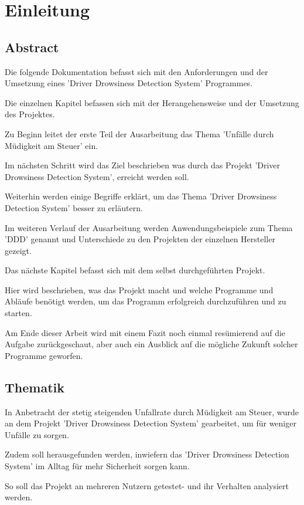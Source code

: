 \section{Einleitung}


\subsection{Abstract}

Die folgende Dokumentation befasst sich mit den Anforderungen und der Umsetzung eines 'Driver Drowsiness Detection System' Programmes.

Die einzelnen Kapitel befassen sich mit der Herangehensweise und der Umsetzung des Projektes.

Zu Beginn leitet der erste Teil der Ausarbeitung das Thema 'Unfälle durch Müdigkeit am Steuer' ein.

Im nächsten Schritt wird das Ziel beschrieben was durch das Projekt 'Driver Drowsiness Detection System', erreicht werden soll.

Weiterhin werden einige Begriffe erklärt, um das Thema 'Driver Drowsiness Detection System' besser zu erläutern.

Im weiteren Verlauf der Ausarbeitung werden Anwendungsbeispiele zum Thema 'DDD' genannt und 
Unterschiede zu den Projekten der einzelnen Hersteller gezeigt.

Das nächste Kapitel befasst sich mit dem selbst durchgeführten Projekt.

Hier wird beschrieben, was das Projekt macht und welche Programme und Abläufe benötigt werden, 
um das Programm erfolgreich durchzuführen und zu starten.

Am Ende dieser Arbeit wird mit einem Fazit noch einmal resümierend auf die Aufgabe zurückgeschaut, 
aber auch ein Ausblick auf die mögliche Zukunft solcher Programme geworfen. 

\subsection{Thematik}

In Anbetracht der stetig steigenden Unfallrate durch Müdigkeit am Steuer, wurde an dem Projekt 'Driver Drowsiness Detection System' gearbeitet, um für weniger Unfälle zu sorgen.

Zudem soll herausgefunden werden, inwiefern das 'Driver Drowsiness Detection System' im Alltag für mehr Sicherheit sorgen kann. 

So soll das Projekt an mehreren Nutzern getestet- und ihr Verhalten analysiert werden.

